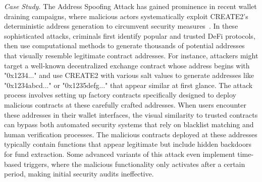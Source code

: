 \documentclass[acmsmall, screen]{acmart}
\begin{document}
	\textit{Case Study.} The Address Spoofing Attack has gained prominence in recent wallet draining
	campaigns, where malicious actors systematically exploit CREATE2's deterministic address generation
	to circumvent security measures~\cite{scamsniffer-create2-bypass,checkpoint-create2-security}.
	In these sophisticated attacks, criminals first identify popular and trusted DeFi protocols,
	then use computational methods to generate thousands of potential addresses that visually
	resemble legitimate contract addresses. For instance, attackers might target a well-known
	decentralized exchange contract whose address begins with "0x1234..." and use CREATE2 with various
	salt values to generate addresses like "0x1234abcd..." or "0x1235defg..." that appear similar at
	first glance. The attack process involves setting up factory contracts specifically designed to
	deploy malicious contracts at these carefully crafted addresses. When users encounter these addresses
	in their wallet interfaces, the visual similarity to trusted contracts can bypass both automated
	security systems that rely on blacklist matching and human verification processes. The malicious
	contracts deployed at these addresses typically contain functions that appear legitimate but include
	hidden backdoors for fund extraction. Some advanced variants of this attack even implement time-based
	triggers, where the malicious functionality only activates after a certain period, making
	initial security audits ineffective.
\end{document}
